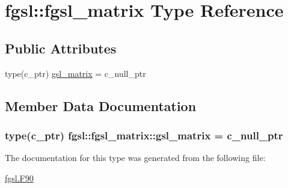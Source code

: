 \hypertarget{structfgsl_1_1fgsl__matrix}{\section{fgsl\-:\-:fgsl\-\_\-matrix Type Reference}
\label{structfgsl_1_1fgsl__matrix}
}
\subsection*{Public Attributes}
\begin{DoxyCompactItemize}
\item 
type(c\-\_\-ptr) \hyperlink{structfgsl_1_1fgsl__matrix_af53153abbad993e0d423a1c3919ed56b}{gsl\-\_\-matrix} = c\-\_\-null\-\_\-ptr
\end{DoxyCompactItemize}


\subsection{Member Data Documentation}
\hypertarget{structfgsl_1_1fgsl__matrix_af53153abbad993e0d423a1c3919ed56b}{
\subsubsection[{gsl\-\_\-matrix}]{\setlength{\rightskip}{0pt plus 5cm}type(c\-\_\-ptr) fgsl\-::fgsl\-\_\-matrix\-::gsl\-\_\-matrix = c\-\_\-null\-\_\-ptr}}\label{structfgsl_1_1fgsl__matrix_af53153abbad993e0d423a1c3919ed56b}


The documentation for this type was generated from the following file\-:\begin{DoxyCompactItemize}
\item 
\hyperlink{fgsl_8F90}{fgsl.\-F90}\end{DoxyCompactItemize}
